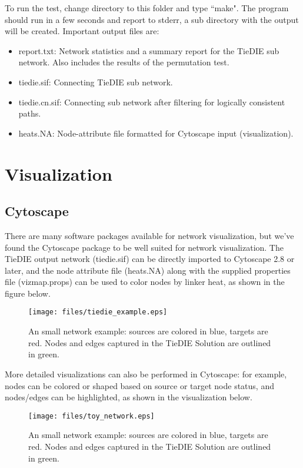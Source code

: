 \documentclass[11pt]{report}
\begin{document}
\noindent To run the test, change directory to this folder and type ``make". The program should run in a few seconds and report 
to stderr, a sub directory with the output will be created. Important output files are:

	\begin{itemize}
	\item report.txt: Network statistics and a summary report for the TieDIE sub network. Also includes the results of the 
	permutation test. 
	\item tiedie.sif: Connecting TieDIE sub network.
	\item tiedie.cn.sif: Connecting sub network after filtering for logically consistent paths. 
	\item heats.NA: Node-attribute file formatted for Cytoscape input (visualization). 
	\end{itemize}

\section{Visualization}

\subsection{Cytoscape}

\noindent There are many software packages available for network visualization, but we've found the Cytoscape package \cite{Cytoscape03} to be well suited for network visualization. The TieDIE output network (tiedie.sif) can be directly imported to Cytoscape 2.8 or later, and the node attribute file (heats.NA) along with the supplied properties file (vizmap.props) can be used to color nodes by linker heat, as shown in the figure below.

\begin{figure}[h]
    \texttt{[image: files/tiedie\_example.eps]}
	\caption{An small network example: sources are colored in blue, targets are red. Nodes and edges captured in the TieDIE Solution are outlined in green.}
    \label{fig:toy_network}
\end{figure}

\clearpage

More detailed visualizations can also be performed in Cytoscape: for example, nodes can be colored or shaped based on source or
target node status, and nodes/edges can be highlighted, as shown in the visualization below. 

\begin{figure}[h]
    \texttt{[image: files/toy\_network.eps]}
	\caption{An small network example: sources are colored in blue, targets are red. Nodes and edges captured in the TieDIE Solution are outlined in green.}
    \label{fig:toy_network}
\end{figure}
\end{document}
